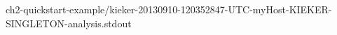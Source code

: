 \setTextListing

{ch2-quickstart-example/kieker-20130910-120352847-UTC-myHost-KIEKER-SINGLETON-analysis.stdout}